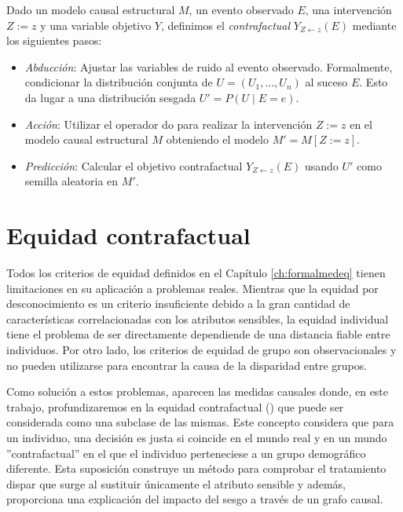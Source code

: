 \documentclass[oneside,openright,titlepage,numbers=noenddot,openany,headinclude,footinclude=true,
cleardoublepage=empty,abstractoff,BCOR=5mm,paper=a4,fontsize=12pt,main=spanish]{scrreprt}
\begin{document}
\begin{definition} \label{def:pasoscontra}
Dado un modelo causal estructural $M$, un evento observado $E$, una intervención $Z := z$ y una variable objetivo $Y$, definimos el \textit{contrafactual} $Y_{Z \leftarrow z}(E)$ mediante los siguientes pasos:

\begin{itemize}
    \item \textit{Abducción}: Ajustar las variables de ruido al evento observado. Formalmente, condicionar la distribución conjunta de $U = (U_1,\dots,U_n)$ al suceso $E$. Esto da lugar a una distribución sesgada $U'=P(U \mid E=e)$.
    \item \textit{Acción}: Utilizar el operador do para realizar la intervención $Z := z$ en el modelo causal estructural $M$ obteniendo el modelo $M' = M[Z := z]$.
    \item \textit{Predicción}: Calcular el objetivo contrafactual $Y_{Z \leftarrow z}(E)$ usando $U'$ como semilla aleatoria en $M'$.
\end{itemize}
\end{definition}


\section{Equidad contrafactual}

Todos los criterios de equidad definidos en el Capítulo \ref{ch:formalmedeq} tienen limitaciones en su aplicación a problemas reales. Mientras que la equidad por desconocimiento es un criterio insuficiente debido a la gran cantidad de características correlacionadas con los atributos sensibles, la equidad individual tiene el problema de ser directamente dependiende de una distancia fiable entre individuos. Por otro lado, los criterios de equidad de grupo son observacionales y no pueden utilizarse para encontrar la causa de la disparidad entre grupos. 

Como solución a estos problemas, aparecen las medidas causales donde, en este trabajo, profundizaremos en la equidad contrafactual (\cite{worlds2017}) que puede ser considerada como una subclase de las mismas. Este concepto considera que para un individuo, una decisión es justa si coincide en el mundo real y en un mundo ''contrafactual'' en el que el individuo perteneciese a un grupo demográfico diferente. Esta suposición construye un método para comprobar el tratamiento dispar que surge al sustituir únicamente el atributo sensible y además, proporciona una explicación del impacto del sesgo a través de un grafo causal.\\
\end{document}
